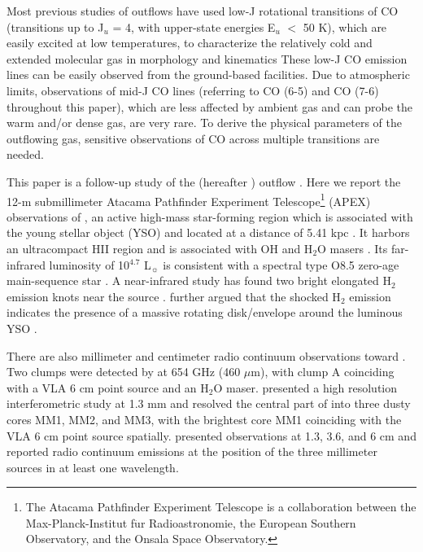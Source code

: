 Most previous studies of outflows have used low-J rotational transitions of CO (transitions up to J$_u$ = 4, with upper-state energies E$_u$ $<$ 50 K), which are easily excited at low temperatures, to characterize the relatively cold and extended molecular gas in morphology and kinematics  These low-J CO emission lines can be easily observed from the ground-based facilities. Due to atmospheric limits, observations of mid-J CO lines (referring to CO (6-5) and CO (7-6) throughout this paper), which are less affected by ambient gas and can probe the warm and/or dense gas, are very rare. To derive the physical parameters of the outflowing gas, sensitive observations of CO across multiple transitions are needed. 


This paper is a follow-up study of the  (hereafter ) outflow \citep{2009ApJ...696...66Q}. Here we report the 12-m submillimeter Atacama Pathfinder Experiment Telescope\footnote{    The Atacama Pathfinder Experiment Telescope is a collaboration between the Max-Planck-Institut f$\ddot{\mathrm{u}}$r Radioastronomie, the European Southern Observatory, and the Onsala Space Observatory.} (APEX) observations of , an active high-mass star-forming region which is associated with the young stellar object (YSO)  and located at a distance of 5.41 kpc \citep{2015PASJ...67...69S}. It harbors an ultracompact HII region and is associated with OH and H$_2$O masers \citep{1993AJ....105.1495H,1997MNRAS.289..203C,1998AJ....116.1897M,1999ApJS..123..487M,2003MNRAS.341..551C}. Its far-infrared luminosity of 10$^{4.7}$ L$_\sun$ is consistent with a spectral type O8.5 zero-age main-sequence star \citep{1998AJ....116.1897M}. A near-infrared study has found two bright elongated H$_2$ emission knots near the source \citep{2002ApJ...576..313K}. \citet{2003A&A...412..175K} further argued that the shocked H$_2$ emission indicates the presence of a massive rotating disk/envelope around the luminous YSO . 

There are also millimeter and centimeter radio continuum observations toward . Two clumps were detected by \citet{2007ApJ...654L..87C} at 654 GHz (460 $\mu$m), with clump A coinciding with a VLA 6 cm point source \citep{1993AJ....105.1495H} and an H$_2$O maser. \citet{2009ApJ...696...66Q} presented a high resolution interferometric study at 1.3 mm and resolved the central part of  into three dusty cores MM1, MM2, and MM3, with the brightest core MM1 coinciding with the VLA 6 cm point source spatially. \citet{2011AJ....142..147T} presented observations at 1.3, 3.6, and 6 cm and reported radio continuum emissions at the position of the three millimeter sources in at least one wavelength.

